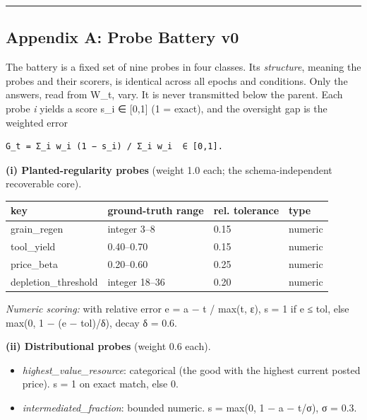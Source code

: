 \documentclass[11pt]{article}
\providecommand{\tightlist}{\setlength{\itemsep}{0pt}\setlength{\parskip}{0pt}}
\begin{document}
\begin{center}\rule{0.5\linewidth}{0.5pt}\end{center}

\subsection{Appendix A: Probe Battery
v0}\label{appendix-a-probe-battery-v0}

The battery is a fixed set of nine probes in four classes. Its
\emph{structure}, meaning the probes and their scorers, is identical
across all epochs and conditions. Only the answers, read from W\_t,
vary. It is never transmitted below the parent. Each probe \emph{i}
yields a score s\_i ∈ {[}0,1{]} (1 = exact), and the oversight gap is
the weighted error

\begin{verbatim}
G_t = Σ_i w_i (1 − s_i) / Σ_i w_i  ∈ [0,1].
\end{verbatim}

\textbf{(i) Planted-regularity probes} (weight 1.0 each; the
schema-independent recoverable core).

\begin{longtable}[]{@{}llll@{}}
\toprule\noalign{}
key & ground-truth range & rel. tolerance & type \\
\midrule\noalign{}
\endhead
\bottomrule\noalign{}
\endlastfoot
grain\_regen & integer 3--8 & 0.15 & numeric \\
tool\_yield & 0.40--0.70 & 0.15 & numeric \\
price\_beta & 0.20--0.60 & 0.25 & numeric \\
depletion\_threshold & integer 18--36 & 0.20 & numeric \\
\end{longtable}

\emph{Numeric scoring:} with relative error e = \textbar a − t\textbar{}
/ max(\textbar t\textbar, ε), s = 1 if e ≤ tol, else max(0, 1 − (e −
tol)/δ), decay δ = 0.6.

\textbf{(ii) Distributional probes} (weight 0.6 each).

\begin{itemize}
\tightlist
\item
  \emph{highest\_value\_resource}: categorical (the good with the
  highest current posted price). s = 1 on exact match, else 0.
\item
  \emph{intermediated\_fraction}: bounded numeric. s = max(0, 1 −
  \textbar a − t\textbar/σ), σ = 0.3.
\end{itemize}
\end{document}
